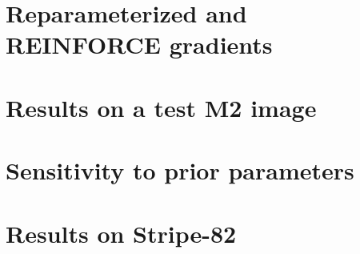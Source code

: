 \documentclass[12pt]{article}
\begin{document}
\clearpage




\appendix
\section{Reparameterized and REINFORCE gradients}
\label{sec:reparam_details}


\section{Results on a test M2 image}
\label{sec:test_m2}



\section{Sensitivity to prior parameters}
\label{sec:prior_sensitivity}



\section{Results on Stripe-82}
\label{sec:results_sparse_field}


% 
\end{document}
